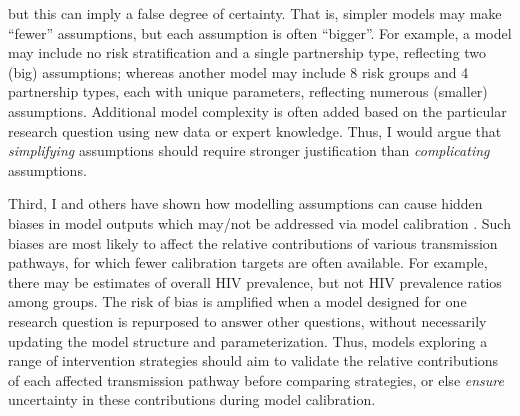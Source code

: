 but this can imply a false degree of certainty.
That is, simpler models may make ``fewer'' assumptions, but each assumption is often ``bigger''.
For example, a model may include no risk stratification and a single partnership type,
reflecting two (big) assumptions; whereas
another model may include 8 risk groups and 4 partnership types, each with unique parameters,
reflecting numerous (smaller) assumptions.
Additional model complexity is often added based on the particular research question
using new data or expert knowledge.
Thus, I would argue that \emph{simplifying} assumptions
should require stronger justification than \emph{complicating} assumptions.
\par
Third, I and others have shown how modelling assumptions can cause
hidden biases in model outputs which may/not be addressed via model calibration
\cite{Hontelez2013,Johnson2016mf,Bernard2017,Knight2020}.
Such biases are most likely to affect
the relative contributions of various transmission pathways,
for which fewer calibration targets are often available.
For example, there may be estimates of overall HIV prevalence,
but not HIV prevalence ratios among groups.
The risk of bias is amplified when a model designed for one research question
is repurposed to answer other questions,
without necessarily updating the model structure and parameterization.
Thus, models exploring a range of intervention strategies should aim to
validate the relative contributions of each affected transmission pathway before comparing strategies,
or else \emph{ensure} uncertainty in these contributions during model calibration.
